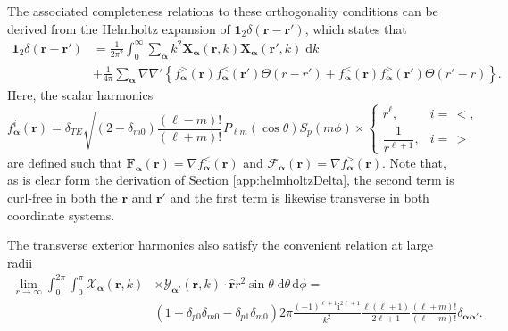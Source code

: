 \documentclass{article}
\begin{document}
The associated completeness relations to these orthogonality conditions can be derived from the Helmholtz expansion of $\bm{1}_2\delta(\mathbf{r} - \mathbf{r}')$, which states that 
\begin{equation}\label{eq:vectorSphericalHarmonicCompleteness}
\begin{split}
\bm{1}_2\delta(\mathbf{r} - \mathbf{r}') &= \frac{1}{2\pi^2}\int_0^\infty\sum_{\bm{\alpha}}k^2\mathbf{X}_{\bm{\alpha}}(\mathbf{r},k)\mathbf{X}_{\bm{\alpha}}(\mathbf{r}',k)\;\mathrm{d}k\\
&+ \frac{1}{4\pi}\sum_{\bm{\alpha}}\nabla\nabla'\left\{ f_{\bm{\alpha}}^>(\mathbf{r})f_{\bm{\alpha}}^<(\mathbf{r}')\Theta(r - r') +  f_{\bm{\alpha}}^<(\mathbf{r})f_{\bm{\alpha}}^>(\mathbf{r}')\Theta(r' - r)\right\}.
\end{split}
\end{equation}
Here, the scalar harmonics 
\begin{equation}\label{eq:scalarHarmonics}
f_{\bm{\alpha}}^i(\mathbf{r}) = \delta_{TE}\sqrt{(2 - \delta_{m0})\frac{(\ell - m)!}{(\ell + m)!}}P_{\ell m}(\cos\theta)S_p(m\phi)\times
\begin{cases}
r^\ell, & i = \, <,\\
\dfrac{1}{r^{\ell + 1}}, & i = \,>
\end{cases}
\end{equation}
are defined such that $\mathbf{F}_{\bm{\alpha}}(\mathbf{r}) = \nabla f_{\bm{\alpha}}^<(\mathbf{r})$ and $\bm{\mathcal{F}}_{\bm{\alpha}}(\mathbf{r}) = \nabla f_{\bm{\alpha}}^>(\mathbf{r})$.
Note that, as is clear form the derivation of Section \ref{app:helmholtzDelta}, the second term is curl-free in both the $\mathbf{r}$ and $\mathbf{r}'$ and the first term is likewise transverse in both coordinate systems.

The transverse exterior harmonics also satisfy the convenient relation at large radii
\begin{equation}
\begin{split}
\lim_{r\to\infty}\int_0^{2\pi}\int_0^\pi \bm{\mathcal{X}}_{\bm{\alpha}}(\mathbf{r},k)&\times\bm{\mathcal{Y}}_{\bm{\alpha}'}(\mathbf{r},k)\cdot\hat{\mathbf{r}}r^2\sin\theta\;\mathrm{d}\theta\,\mathrm{d}\phi = \\
&(1 + \delta_{p0}\delta_{m0} - \delta_{p1}\delta_{m0})2\pi\frac{(-1)^{\ell + 1}\mathrm{i}^{2\ell + 1}}{k^2}\frac{\ell(\ell + 1)}{2\ell + 1}\frac{(\ell + m)!}{(\ell - m)!}\delta_{\bm{\alpha}\bm{\alpha}'}.
\end{split}
\end{equation}
\end{document}
